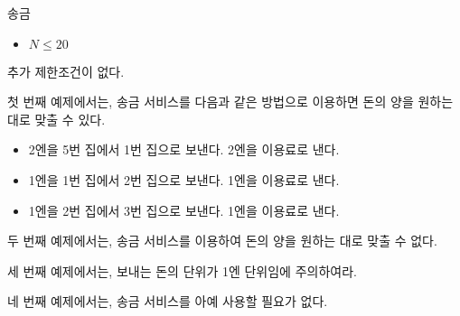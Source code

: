 \begin{problem}{송금}
	\begin{itemize}
		\item $N \le 20$
	\end{itemize}
	
	
	추가 제한조건이 없다.
		
	\Examples
		
	\begin{example}
	\end{example}
	
	\Notes
	
	첫 번째 예제에서는, 송금 서비스를 다음과 같은 방법으로 이용하면 돈의 양을 원하는 대로 맞출 수 있다.
	
	\begin{itemize}
		\item 2엔을 5번 집에서 1번 집으로 보낸다. 2엔을 이용료로 낸다.
		\item 1엔을 1번 집에서 2번 집으로 보낸다. 1엔을 이용료로 낸다.
		\item 1엔을 2번 집에서 3번 집으로 보낸다. 1엔을 이용료로 낸다.
	\end{itemize}

	두 번째 예제에서는, 송금 서비스를 이용하여 돈의 양을 원하는 대로 맞출 수 없다.
	
	세 번째 예제에서는, 보내는 돈의 단위가 1엔 단위임에 주의하여라.
	
	네 번째 예제에서는, 송금 서비스를 아예 사용할 필요가 없다.
	
	
	
\end{problem}

